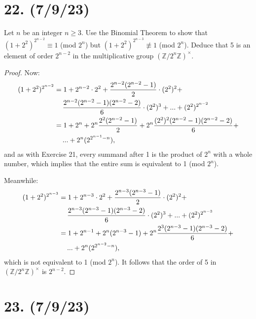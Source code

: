 \documentclass{article}
\begin{document}
\section*{22. (7/9/23)}

Let $n$ be an integer $n \geq 3$. Use the Binomial Theorem to show that $(1 + 2^2)^{2^{n - 2}} \equiv 1$ (mod $2^n$) but $(1 + 2^2)^{2^{n - 3}} \not\equiv 1$ (mod $2^n$). Deduce that 5 is an element of order $2^{n - 2}$ in the multiplicative group $(\mathbb{Z}/2^n \mathbb{Z})^\times$.

\begin{proof}
    Now:
    \begin{align*}
        (1 + 2^2)^{2^{n - 2}} 
        & = 1 + 2^{n - 2} \cdot 2^2 + \frac{2^{n - 2}(2^{n - 2} - 1)}{2} \cdot (2^2)^2 + \\
        & \hspace{1.2em} \frac{2^{n - 2}(2^{n - 2} - 1)(2^{n - 2} - 2)}{6} \cdot (2^2)^3 + ... + (2^2)^{2^{n - 2}} \\
        & = 1 + 2^n + 2^n \frac{2^2 (2^{n - 2} - 1)}{2} + 2^n \frac{(2^2)^2(2^{n - 2} - 1)(2^{n - 2} - 2)}{6} + \\
        & \hspace{1.2em} ... + 2^n (2^{2^{n - 1} - n}),
    \end{align*}
    and as with Exercise 21, every summand after 1 is the product of $2^n$ with a whole number, which implies that the entire sum is equivalent to 1 (mod $2^n$).
    
    Meanwhile:
    \begin{align*}
        (1 + 2^2)^{2^{n - 3}} 
        & = 1 + 2^{n - 3} \cdot 2^2 + \frac{2^{n - 3}(2^{n - 3} - 1)}{2} \cdot (2^2)^2 + \\
        & \hspace{1.2em} \frac{2^{n - 3}(2^{n - 3} - 1)(2^{n - 3} - 2)}{6} \cdot (2^2)^3 + ... + (2^2)^{2^{n - 3}} \\
        & = 1 + 2^{n - 1} + 2^n (2^{n - 3} - 1) + 2^n \frac{2^3 (2^{n - 3} - 1)(2^{n - 3} - 2)}{6} + \\
        & \hspace{1.2em} ... + 2^n (2^{2^{n - 2} - n}),
    \end{align*}
    which is not equivalent to 1 (mod $2^n$). It follows that the order of 5 in $(\mathbb{Z}/2^n \mathbb{Z})^\times$ is $2^{n - 2}$.
\end{proof}

\section*{23. (7/9/23)}
\end{document}
